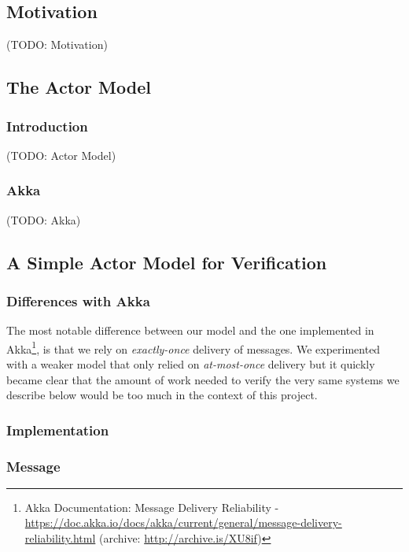 \documentclass[a4paper,twoside]{article}
\newcommand{\TODO}[1]{\textcolor{YellowOrange}{(TODO: #1)}} %
\begin{document}
\begin{enumerate}
\subsection{Motivation}

\TODO{Motivation}

\subsection{The Actor Model}

\subsubsection{Introduction}

\TODO{Actor Model}

\subsubsection{Akka}

\TODO{Akka}

\subsection{A Simple Actor Model for Verification}

\subsubsection{Differences with Akka}

The most notable difference between our model and the one implemented in Akka\footnote{Akka Documentation: Message Delivery Reliability - \url{https://doc.akka.io/docs/akka/current/general/message-delivery-reliability.html} (archive: \url{http://archive.is/XU8if})}, is that we rely on \textit{exactly-once} delivery of messages. We experimented with a weaker model that only relied on \textit{at-most-once} delivery but it quickly became clear that the amount of work needed to verify the very same systems we describe below would be too much in the context of this project.

\subsubsection{Implementation}

\subsubsection*{Message}


\end{enumerate}
\end{document}
